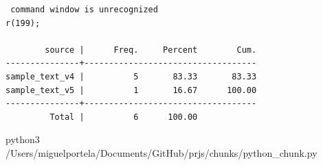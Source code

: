 \documentclass[
  12pt,
]{article}
\newenvironment{Shaded}{\begin{snugshade}}{\end{snugshade}}
\newcommand{\ExtensionTok}[1]{#1}
\newcommand{\KeywordTok}[1]{\textcolor[rgb]{0.13,0.29,0.53}{\textbf{#1}}}
\newcommand{\NormalTok}[1]{#1}
\begin{document}
\begin{verbatim}
 command window is unrecognized
r(199);

        source |      Freq.     Percent        Cum.
---------------+-----------------------------------
sample_text_v4 |          5       83.33       83.33
sample_text_v5 |          1       16.67      100.00
---------------+-----------------------------------
         Total |          6      100.00
\end{verbatim}

\begin{Shaded}
\begin{Highlighting}[]
\ExtensionTok{python3}\NormalTok{ /Users/miguelportela/Documents/GitHub/prjs/chunks/python_chunk.py}
\end{Highlighting}
\end{Shaded}

\begin{Shaded}
\end{Shaded}
\end{document}
